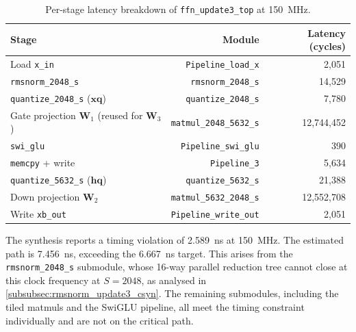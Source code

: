 \begin{table}[H]
  \centering
  \begin{tabular}{lrr}
    \toprule
    Stage & Module & Latency (cycles) \\
    \midrule
    Load \texttt{x\_in}                       & \texttt{Pipeline\_load\_x}     &          2{,}051 \\
    \texttt{rmsnorm\_2048\_s}                  & \texttt{rmsnorm\_2048\_s}       &         14{,}529 \\
    \texttt{quantize\_2048\_s} ($\mathbf{xq}$) & \texttt{quantize\_2048\_s}     &          7{,}780 \\
    Gate projection $\mathbf{W}_1$ (reused for $\mathbf{W}_3$) & \texttt{matmul\_2048\_5632\_s} & 12{,}744{,}452 \\
    \texttt{swi\_glu}                          & \texttt{Pipeline\_swi\_glu}    &             390 \\
    \texttt{memcpy} + write                    & \texttt{Pipeline\_3}           &          5{,}634 \\
    \texttt{quantize\_5632\_s} ($\mathbf{hq}$) & \texttt{quantize\_5632\_s}     &         21{,}388 \\
    Down projection $\mathbf{W}_2$             & \texttt{matmul\_5632\_2048\_s} & 12{,}552{,}708 \\
    Write \texttt{xb\_out}                     & \texttt{Pipeline\_write\_out}  &          2{,}051 \\
    \bottomrule
  \end{tabular}
  \caption{Per-stage latency breakdown of \texttt{ffn\_update3\_top}
           at \SI{150}{\mega\hertz}.}
  \label{tab:ffn_u3_latency}
\end{table}

The synthesis reports a timing violation of \SI{2.589}{\nano\second}
at \SI{150}{\mega\hertz}. The estimated path is \SI{7.456}{\nano\second},
exceeding the \SI{6.667}{\nano\second} target. This arises from the
\texttt{rmsnorm\_2048\_s} submodule, whose 16-way parallel reduction tree
cannot close at this clock frequency at $S = 2048$, as analysed in
\cref{subsubsec:rmsnorm_update3_csyn}. The remaining submodules, including
the tiled matmuls and the SwiGLU pipeline, all meet the timing constraint
individually and are not on the critical path.

